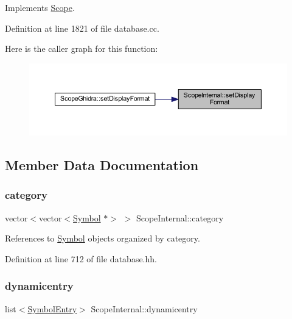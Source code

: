 Implements \mbox{\hyperlink{class_scope_ae799cc3171536b9ee10497631aea8c5b}{Scope}}.



Definition at line 1821 of file database.\+cc.

Here is the caller graph for this function\+:
\nopagebreak
\begin{figure}[H]
\begin{center}
\leavevmode
\includegraphics[width=350pt]{class_scope_internal_a4f5d61b1f41e067018e1cc4ecc044536_icgraph}
\end{center}
\end{figure}


\subsection{Member Data Documentation}
\mbox{\label{class_scope_internal_a52896f135c4c695914fba0e28d198308}} 
\subsubsection{\texorpdfstring{category}{category}}
{\footnotesize\ttfamily vector$<$vector$<$\mbox{\hyperlink{class_symbol}{Symbol}} $\ast$$>$ $>$ Scope\+Internal\+::category\hspace{0.3cm}{\ttfamily [protected]}}



References to \mbox{\hyperlink{class_symbol}{Symbol}} objects organized by category. 



Definition at line 712 of file database.\+hh.

\mbox{\label{class_scope_internal_a74bb56d748daae518b88b73d8f687d75}} 
\subsubsection{\texorpdfstring{dynamicentry}{dynamicentry}}
{\footnotesize\ttfamily list$<$\mbox{\hyperlink{class_symbol_entry}{Symbol\+Entry}}$>$ Scope\+Internal\+::dynamicentry\hspace{0.3cm}{\ttfamily [protected]}}




